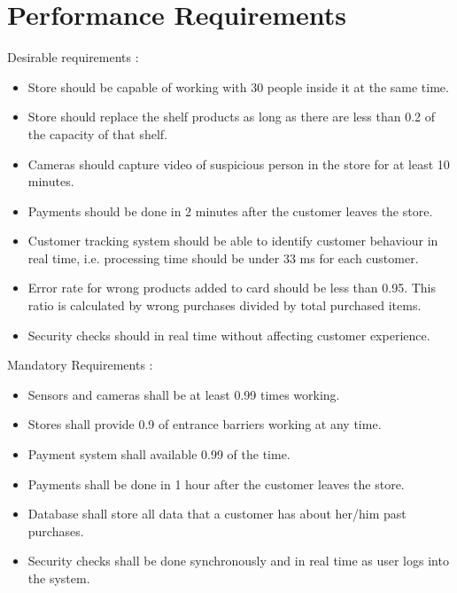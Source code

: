 \section{Performance Requirements}



Desirable requirements :
\begin{itemize}
    \item Store should be capable of working with 30 people inside it at the same time.
    \item Store should replace the shelf products as long as there are less than 0.2 of the capacity of that shelf.
    \item Cameras should capture video of suspicious person in the store for at least 10 minutes.
    \item Payments should be done in 2 minutes after the customer leaves the store.
    \item Customer tracking system should be able to identify customer behaviour in real time, i.e. processing time should be under 33 ms for each customer.
    \item Error rate for wrong products added to card should be less than 0.95. This ratio is calculated by wrong purchases divided by total purchased items.
    \item Security checks should in real time without affecting customer experience.
\end{itemize}

Mandatory Requirements :
\begin{itemize}
    \item Sensors and cameras shall be at least 0.99 times working.
    \item Stores shall provide 0.9 of entrance barriers working at any time.
    \item Payment system shall available 0.99 of the time.
    \item Payments shall be done in 1 hour after the customer leaves the store.
    \item Database shall store all data that a customer has about her/him past purchases.
    \item Security checks shall be done synchronously and in real time as user logs into the system.
\end{itemize}
